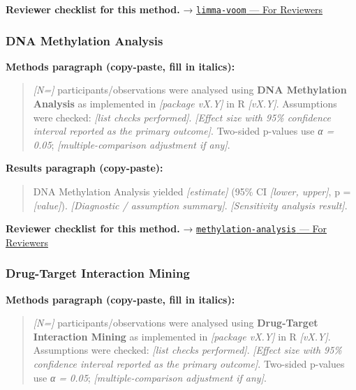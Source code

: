 \documentclass[
]{article}
\begin{document}
\textbf{Reviewer checklist for this method.} →
\href{../chapters/12-bioinformatics/limma-voom.Rmd\#for-reviewers}{\texttt{limma-voom}
--- For Reviewers}

\subsubsection{DNA Methylation Analysis}\label{dna-methylation-analysis}

\textbf{Methods paragraph (copy-paste, fill in italics):}

\begin{quote}
\emph{{[}N={]}} participants/observations were analysed using
\textbf{DNA Methylation Analysis} as implemented in \emph{{[}package
vX.Y{]}} in R \emph{{[}vX.Y{]}}. Assumptions were checked: \emph{{[}list
checks performed{]}}. \emph{{[}Effect size with 95\% confidence interval
reported as the primary outcome{]}}. Two-sided p-values use \emph{α =
0.05}; \emph{{[}multiple-comparison adjustment if any{]}}.
\end{quote}

\textbf{Results paragraph (copy-paste):}

\begin{quote}
DNA Methylation Analysis yielded \emph{{[}estimate{]}} (95\% CI
\emph{{[}lower, upper{]}}, p = \emph{{[}value{]}}). \emph{{[}Diagnostic
/ assumption summary{]}}. \emph{{[}Sensitivity analysis result{]}}.
\end{quote}

\textbf{Reviewer checklist for this method.} →
\href{../chapters/12-bioinformatics/methylation-analysis.Rmd\#for-reviewers}{\texttt{methylation-analysis}
--- For Reviewers}

\subsubsection{Drug-Target Interaction
Mining}\label{drug-target-interaction-mining}

\textbf{Methods paragraph (copy-paste, fill in italics):}

\begin{quote}
\emph{{[}N={]}} participants/observations were analysed using
\textbf{Drug-Target Interaction Mining} as implemented in
\emph{{[}package vX.Y{]}} in R \emph{{[}vX.Y{]}}. Assumptions were
checked: \emph{{[}list checks performed{]}}. \emph{{[}Effect size with
95\% confidence interval reported as the primary outcome{]}}. Two-sided
p-values use \emph{α = 0.05}; \emph{{[}multiple-comparison adjustment if
any{]}}.
\end{quote}
\end{document}
